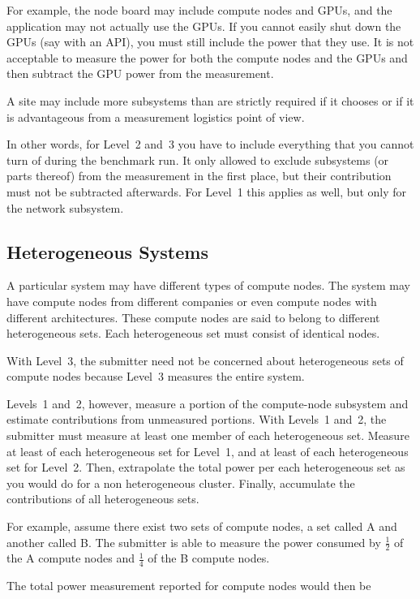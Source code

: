 For example, the node board may include compute nodes and GPUs, and the application may not actually use the GPUs.
If you cannot easily shut down the GPUs (say with an API), you must still include the power that they use.
It is not acceptable to measure the power for both the compute nodes and the GPUs and then subtract the GPU power from the measurement.

A site may include more subsystems than are strictly required if it chooses or if it is advantageous from a measurement logistics point of view.

In other words, for Level~2 and~3 you have to include everything that you cannot turn of during the benchmark run.
It only allowed to exclude subsystems (or parts thereof) from the measurement in the first place, but their contribution must not be subtracted afterwards.
For Level~1 this applies as well, but only for the network subsystem.

\subsection{Heterogeneous Systems}

A particular system may have different types of compute nodes.
The system may have compute nodes from different companies or even compute nodes with different architectures.
These compute nodes are said to belong to different heterogeneous sets.
Each heterogeneous set must consist of identical nodes.

With Level~3, the submitter need not be concerned about heterogeneous sets of compute nodes because Level~3 measures the entire system.

Levels~1 and~2, however, measure a portion of the compute-node subsystem and estimate contributions from unmeasured portions.
With Levels~1 and~2, the submitter must measure at least one member of each heterogeneous set.
Measure at least \SpecFracMinLOne{} of each heterogeneous set for Level~1, and at least \SpecFracMinLTwo{} of each heterogeneous set for Level~2.
Then, extrapolate the total power per each heterogeneous set as you would do for a non heterogeneous cluster.
Finally, accumulate the contributions of all heterogeneous sets.

For example, assume there exist two sets of compute nodes, a set called A and another called B.
The submitter is able to measure the power 
consumed by $ \frac{1}{2} $ of the A compute nodes and $\frac{1}{4}$ of the B compute nodes.

The total power measurement reported for compute nodes would then be 

